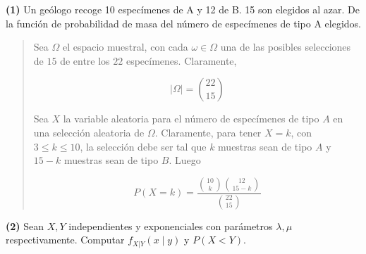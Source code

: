 \documentclass[a4paper, 12pt]{article}
\begin{document}
\textbf{(1)} Un geólogo recoge 10 especímenes de A y 12 de B. 15 son elegidos
al azar. De la función de probabilidad de masa del número de especímenes de tipo
A elegidos.

\small
\begin{quote}

Sea $\Omega$ el espacio muestral, con cada $\omega \in \Omega$ una de las
posibles selecciones de $15$ de entre los $22$ especímenes. Claramente,

\begin{equation*}
  \left| \Omega \right| = \binom{22}{15}
\end{equation*}

Sea $X$ la variable aleatoria para el número de especímenes de tipo $A$ en una
selección aleatoria de $\Omega$. Claramente, para tener $X = k$, con $3 \leq k
\leq 10$, la selección debe ser tal que $k$ muestras sean de tipo $A$ y $15 - k$
muestras sean de tipo $B$. Luego 

\begin{equation*}
  P(X = k) = \frac{\binom{10}{k} \binom{12}{15 - k}}{\binom{22}{15}}
\end{equation*}


\end{quote}
\normalsize


\pagebreak 

\textbf{(2)} Sean $X, Y$ independientes y exponenciales con parámetros $\lambda,
\mu$ respectivamente. Computar $f_{X | Y}(x \mid y)$ y $P(X < Y)$.
\end{document}
